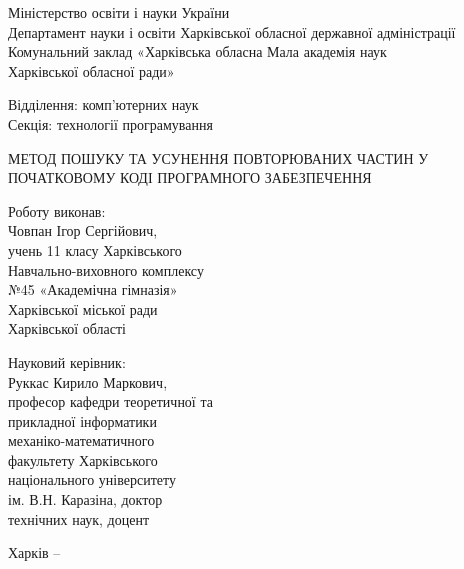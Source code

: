 \documentclass[a4paper, 14pt]{article}
\begin{document}
\thispagestyle{empty}
\begin{spacing}{1}
\begin{center}
Міністерство освіти і науки України \\
Департамент науки і освіти Харківської обласної державної адміністрації \\
Комунальний заклад «Харківська обласна Мала академія наук \\ Харківської обласної ради» \\
\end{center}\par\null\par
\begin{center}
Відділення: комп'ютерних наук\\
Секція: технології програмування
\end{center}\par\null\par
\begin{center}
МЕТОД ПОШУКУ ТА УСУНЕННЯ ПОВТОРЮВАНИХ
ЧАСТИН У ПОЧАТКОВОМУ КОДІ ПРОГРАМНОГО ЗАБЕЗПЕЧЕННЯ
\end{center}\par\null\par\null
\begin{changemargin}{9.75cm}{0cm}
Роботу виконав:\\ 
Човпан Ігор Сергійович,\\
учень 11 класу Харківського\\
Навчально-виховного комплексу\\
№45 «Академічна гімназія»\\
Харківської міської ради\\
Харківської області
\end{changemargin}\par
\begin{changemargin}{9.75cm}{0cm}
Науковий керівник:\\
Руккас Кирило Маркович,\\
професор кафедри теоретичної та\\
прикладної інформатики\\
механіко-математичного\\
факультету Харківського\\
національного університету\\
ім. В.Н. Каразіна, доктор\\
технічних наук, доцент\\
\vspace*{\fill}\end{changemargin}
\begin{center}
Харків -- \the\year{}
\end{center}\end{spacing}
\end{document}
